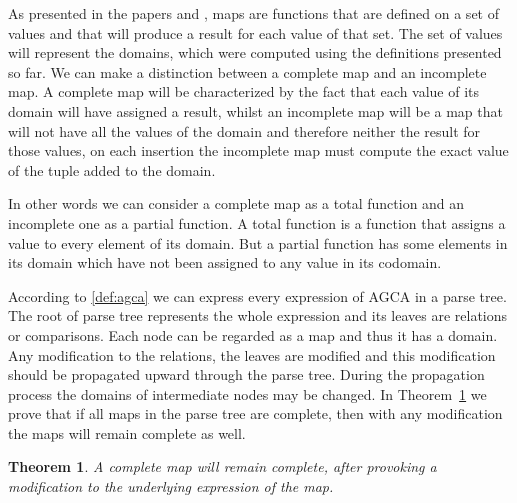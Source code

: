 \documentclass[12pt]{article}
\newtheorem{theorem}{Theorem}[section]
\begin{document}
As presented in the papers \cite{1} and \cite{2}, maps are functions that are defined on a set of values and that will produce a result for each value of that set. The set of values will represent the domains, which were computed using the definitions presented so far. We can make a distinction between a complete map and an incomplete map. A complete map will be characterized by the fact that each value of its domain will have assigned a result, whilst an incomplete map will be a map that will not have all the values of the domain and therefore neither the result for those values, on each insertion the incomplete map must compute the exact value of the tuple added to the domain.\\ \par
In other words we can consider a complete map as a total function and an incomplete one as a partial function. A total function is a function that assigns a value to every element of its domain. But a partial function has some elements in its domain which have not been assigned to any value in its codomain. \par

According to \ref{def:agca} we can express every expression of AGCA in a parse tree. The root of parse tree represents the whole expression and its leaves are relations or comparisons. Each node can be regarded as a map and thus it has a domain. Any modification to the relations, the leaves are modified and this modification should be propagated upward through the parse tree. During the propagation process the domains of intermediate nodes may be changed. In Theorem~\ref{theorem:completemap} we prove that if all maps in the parse tree are complete, then with any modification the maps will remain complete as well. 

\begin{theorem}
\label{theorem:completemap}
A complete map will remain complete, after provoking a modification to the underlying expression of the map.
\end{theorem}
\end{document}
